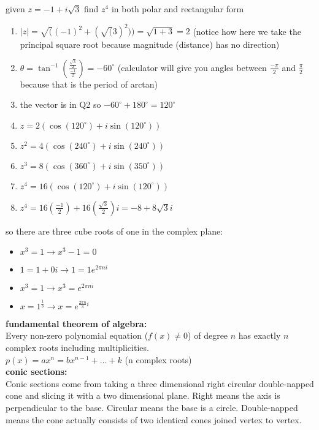 \documentclass{article}
\begin{document}
given $z = -1 + i\sqrt{3}$ find $z^4$ in both polar and rectangular form
	\begin{enumerate}
		\item $\lvert z\rvert = \sqrt((-1)^2 + (\sqrt(3)^2)) = \sqrt{1 + 3} = 2$ (notice how here we take the principal square root because magnitude (distance) has no direction)
		\item $\theta = \tan^{-1}(\frac{\frac{\sqrt{3}}{2}}{\frac{-1}{2}}) = -60^{\circ}$ (calculator will give you angles between $\frac{-\pi}{2}$ and $\frac{\pi}{2}$ because that is the period of arctan)
		\item the vector is in Q2 so $-60^{\circ} + 180^{\circ} = 120^{\circ}$
		\item $z = 2(\cos(120^{\circ}) + i\sin(120^{\circ}))$
		\item $z^2 = 4(\cos(240^{\circ}) + i\sin(240^{\circ}))$		
		\item $z^3 = 8(\cos(360^{\circ}) + i\sin(350^{\circ}))$
		\item $z^4 = 16(\cos(120^{\circ}) + i\sin(120^{\circ}))$
		\item $z^4 = 16(\frac{-1}{2}) + 16(\frac{\sqrt{3}}{2})i = -8 + 8\sqrt{3}i$
	\end{enumerate}

so there are three cube roots of one in the complex plane:\\
	\begin{itemize}
		\item $x^3 = 1 \to x^3 - 1 = 0$ 
		\item $1 = 1 + 0i \to 1 = 1e^{2\pi ni}$
		\item $x^3 = 1 \to x^3 = e^{2\pi ni}$
		\item $x = 1^{\frac{1}{3}} \to x = e^{\frac{2\pi n}{3}i}$
	\end{itemize}

\textbf{fundamental theorem of algebra:}\\

Every non-zero polynomial equation ($f(x) \neq 0$) of degree $n$ has exactly $n$ complex roots including multiplicities.\\

$p(x) = ax^n = bx^{n-1} + \ldots + k$ (n complex roots)\\

\textbf{conic sections:}\\

Conic sections come from taking a three dimensional right circular double-napped cone and slicing it with a two dimensional plane. Right means the axis is perpendicular to the base. Circular means the base is a circle. Double-napped means the cone actually consists of two identical cones joined vertex to vertex.\\
\end{document}
